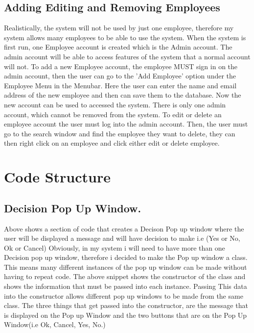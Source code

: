 \subsection{Adding Editing and Removing Employees}
Realistically, the system will not be used by just one employee, therefore my system allows many employees to be able to use the system. When the system is first run, one Employee account is created which is the Admin account. The admin account will be able to access features of the system that a normal account will not. To add a new Employee account, the employee MUST sign in on the admin account, then the user can go to the 'Add Employee' option under the Employee Menu in the Menubar. Here the user can enter the name and email address of the new employee and then can save them to the database. Now the new account can be used to accessed the system. There is only one admin account, which cannot be removed from the system.
To edit or delete an employee account the user must log into the admin account. Then, the user must go to the search window and find the employee they want to delete, they can then right click on an employee and click either edit or delete employee.


\section{Code Structure}


\subsection{Decision Pop Up Window.}
\begin{figure}[H]
\end{figure}

Above shows a section of code that creates a Decison Pop up window where the user will be displayed a message and will have decision to make i.e (Yes or No, Ok or Cancel)
Obviously, in my system i will need to have more than one Decision pop up window, therefore i decided to make the Pop up window a class. This means many different instances of the pop up window can be made without having to repeat code. The above snippet shows the constructor of the class and shows the information that must be passed into each instance. Passing This data into the constructor allows different pop up windows to be made from the same class. The three things that get passed into the constructor, are the message that is displayed on the Pop up Window and the two buttons that are on the Pop Up Window(i.e Ok, Cancel, Yes, No.)

